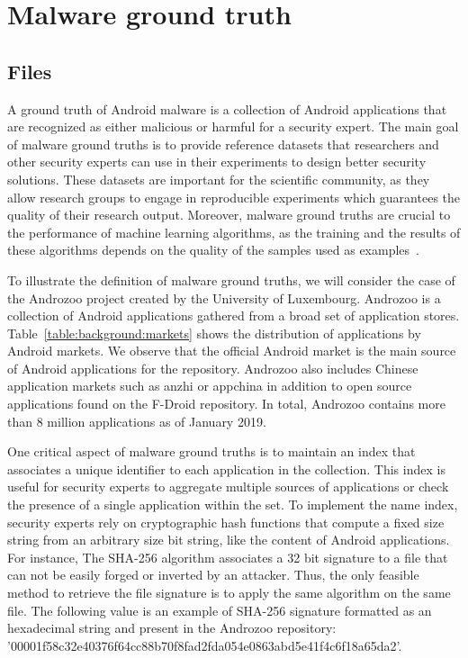 \section{Malware ground truth}
\subsection{Files}
A ground truth of Android malware is a collection of Android applications that are recognized as either malicious or harmful for a security expert.
The main goal of malware ground truths is to provide reference datasets that researchers and other security experts can use in their experiments to design better security solutions.
These datasets are important for the scientific community, as they allow research groups to engage in reproducible experiments which guarantees the quality of their research output.
Moreover, malware ground truths are crucial to the performance of machine learning algorithms, as the training and the results of these algorithms depends on the quality of the samples used as examples~\cite{rossow_prudent_2012,sommer_outside_2010}.



To illustrate the definition of malware ground truths, we will consider the case of the Androzoo project created by the University of Luxembourg.
Androzoo is a collection of Android applications gathered from a broad set of application stores.
Table~\ref{table:background:markets} shows the distribution of applications by Android markets.
We observe that the official Android market is the main source of Android applications for the repository.
Androzoo also includes Chinese application markets such as anzhi or appchina in addition to open source applications found on the F-Droid repository.
In total, Androzoo contains more than 8 million applications as of January 2019.

One critical aspect of malware ground truths is to maintain an index that associates a unique identifier to each application in the collection.
This index is useful for security experts to aggregate multiple sources of applications or check the presence of a single application within the set.
To implement the name index, security experts rely on cryptographic hash functions that compute a fixed size string from an arbitrary size bit string, like the content of Android applications.
For instance, The SHA-256 algorithm associates a 32 bit signature to a file that can not be easily forged or inverted by an attacker.
Thus, the only feasible method to retrieve the file signature is to apply the same algorithm on the same file.
The following value is an example of SHA-256 signature formatted as an hexadecimal string and present in the Androzoo repository: '00001f58c32e40376f64cc88b70f8fad2fda054e0863abd5e41f4c6f18a65da2'.
